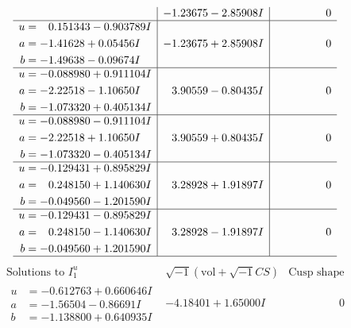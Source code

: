 \documentclass[1p]{elsarticle_modified}
\theoremstyle{definition}
\newcommand{\I}{\sqrt{-1}}
\begin{document}
$$\begin{array}{c|c|c}
 & -1.23675 - 2.85908 I & \phantom{-0.000000 } 0 \\ \hline\begin{aligned}
u &= \phantom{-}0.151343 - 0.903789 I \\
a &= -1.41628 + 0.05456 I \\
b &= -1.49638 - 0.09674 I\end{aligned}
 & -1.23675 + 2.85908 I & \phantom{-0.000000 } 0 \\ \hline\begin{aligned}
u &= -0.088980 + 0.911104 I \\
a &= -2.22518 - 1.10650 I \\
b &= -1.073320 + 0.405134 I\end{aligned}
 & \phantom{-}3.90559 - 0.80435 I & \phantom{-0.000000 } 0 \\ \hline\begin{aligned}
u &= -0.088980 - 0.911104 I \\
a &= -2.22518 + 1.10650 I \\
b &= -1.073320 - 0.405134 I\end{aligned}
 & \phantom{-}3.90559 + 0.80435 I & \phantom{-0.000000 } 0 \\ \hline\begin{aligned}
u &= -0.129431 + 0.895829 I \\
a &= \phantom{-}0.248150 + 1.140630 I \\
b &= -0.049560 - 1.201590 I\end{aligned}
 & \phantom{-}3.28928 + 1.91897 I & \phantom{-0.000000 } 0 \\ \hline\begin{aligned}
u &= -0.129431 - 0.895829 I \\
a &= \phantom{-}0.248150 - 1.140630 I \\
b &= -0.049560 + 1.201590 I\end{aligned}
 & \phantom{-}3.28928 - 1.91897 I & \phantom{-0.000000 } 0\\
 \hline 
 \end{array}$$\newpage$$\begin{array}{c|c|c}  
\text{Solutions to }I^u_{1}& \I (\text{vol} + \sqrt{-1}CS) & \text{Cusp shape}\\
 \hline 
\begin{aligned}
u &= -0.612763 + 0.660646 I \\
a &= -1.56504 - 0.86691 I \\
b &= -1.138800 + 0.640935 I\end{aligned}
 & -4.18401 + 1.65000 I & \phantom{-0.000000 } 0 \\ \hline\begin{aligned}

\end{aligned}
\end{array}$$
\end{document}
